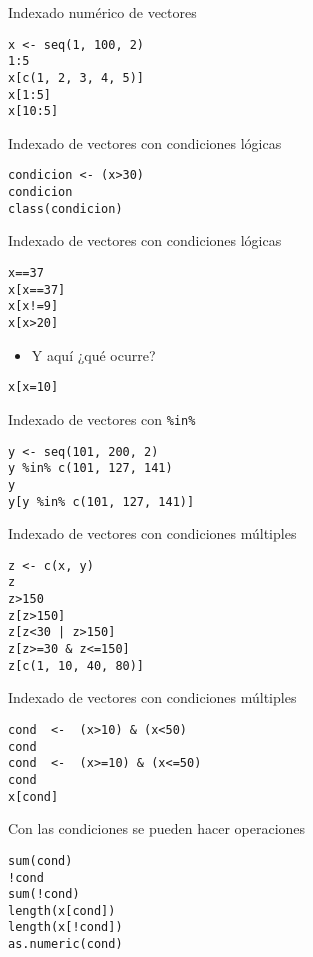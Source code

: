 \documentclass[xcolor={usenames,svgnames,dvipsnames}]{beamer}
\begin{document}
\begin{frame}[fragile,label=sec-2-1-8]{Indexado numérico de vectores}
 \lstset{language=R,numbers=none}
\begin{lstlisting}
x <- seq(1, 100, 2)
1:5
x[c(1, 2, 3, 4, 5)]
x[1:5]
x[10:5]
\end{lstlisting}
\end{frame}
\begin{frame}[fragile,label=sec-2-1-9]{Indexado de vectores con condiciones lógicas}
 \lstset{language=R,numbers=none}
\begin{lstlisting}
condicion <- (x>30)
condicion
class(condicion)
\end{lstlisting}
\end{frame}
\begin{frame}[fragile,label=sec-2-1-10]{Indexado de vectores con condiciones lógicas}
 \lstset{language=R,numbers=none}
\begin{lstlisting}
x==37
x[x==37]
x[x!=9]
x[x>20]
\end{lstlisting}

\begin{itemize}
\item Y aquí ¿qué ocurre?
\end{itemize}
\lstset{language=R,numbers=none}
\begin{lstlisting}
x[x=10]
\end{lstlisting}
\end{frame}
\begin{frame}[fragile,label=sec-2-1-11]{Indexado de vectores con \texttt{\%in\%}}
 \lstset{language=R,numbers=none}
\begin{lstlisting}
y <- seq(101, 200, 2)
y %in% c(101, 127, 141)
y
y[y %in% c(101, 127, 141)]
\end{lstlisting}
\end{frame}
\begin{frame}[fragile,label=sec-2-1-12]{Indexado de vectores con condiciones múltiples}
 \lstset{language=R,numbers=none}
\begin{lstlisting}
z <- c(x, y)
z
z>150
z[z>150]
z[z<30 | z>150]
z[z>=30 & z<=150]
z[c(1, 10, 40, 80)]
\end{lstlisting}
\end{frame}
\begin{frame}[fragile,label=sec-2-1-13]{Indexado de vectores con condiciones múltiples}
 \lstset{language=R,numbers=none}
\begin{lstlisting}
cond  <-  (x>10) & (x<50)
cond
cond  <-  (x>=10) & (x<=50)
cond
x[cond]
\end{lstlisting}
\end{frame}
\begin{frame}[fragile,label=sec-2-1-14]{Con las condiciones se pueden hacer operaciones}
 \lstset{language=R,numbers=none}
\begin{lstlisting}
sum(cond)
!cond
sum(!cond)
length(x[cond])
length(x[!cond])
as.numeric(cond)
\end{lstlisting}
\end{frame}
\end{document}
